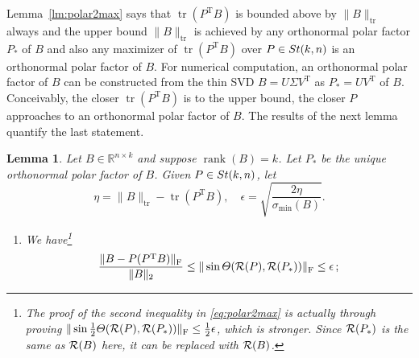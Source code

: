 \documentclass[11pt]{article}
\def\bbR{\mathbb{R}}
\def\cR{{\cal R}}
\newcommand\STM[2]{{\rm St}(#1,#2)}
\DeclareMathOperator{\rank}{rank}
\DeclareMathOperator{\tr}{tr}
\DeclareMathOperator{\F}{F}
\DeclareMathOperator{\T}{T}
\newtheorem{lemma}{Lemma}[section]
\theoremstyle{definition}
\numberwithin{equation}{section}
\begin{document}
Lemma~\ref{lm:polar2max} says that $\tr(P^{\T}B)$  is bounded  above by $\|B\|_{\tr}$ always and the upper bound
$\|B\|_{\tr}$ is achieved
by any orthonormal polar factor $P_*$ of $B$ and also any maximizer of $\tr(P^{\T}B)$ over $P\in\STM{k}{n}$ is an orthonormal polar factor of $B$.
For numerical computation, an orthonormal polar factor of $B$ can be constructed from the thin SVD $B=U\Sigma V^{\T}$ as
$P_*=UV^{\T}$ of $B$. Conceivably,
the closer $\tr(P^{\T}B)$ is to the upper bound, the closer $P$ approaches to an orthonormal polar factor of $B$.
The results of the next lemma quantify the last statement.

\begin{lemma}\label{lm:polar2max'}
Let $B\in\bbR^{n\times k}$ and suppose $\rank(B)=k$. Let $P_*$ be the unique
orthonormal polar factor of $B$.  Given $P\in\STM{k}{n}$, let
$$
\eta=\|B\|_{\tr}-\tr(P^{\T}B), \quad
\epsilon=\sqrt{\frac {2\eta}{\sigma_{\min}(B)}}.
$$
\begin{enumerate}[{\rm (a)}]
  \item We have\footnote {The proof of the second inequality in \eqref{eq:polar2max} is actually through proving
            $\|\sin\frac 12\Theta(\cR(P),\cR(P_*))\|_{\F}\le \frac 12{\epsilon}$, which is stronger.
            Since $\cR(P_*)$ is the same as $\cR(B)$ here, it can be replaced with $\cR(B)$.}
        \begin{equation}\label{eq:polar2max}
        \frac {\|B-P(P^{\T}B)\|_{\F}}{\|B\|_2}\le\|\sin\Theta(\cR(P),\cR(P_*))\|_{\F}\le {\epsilon}\,;
        \end{equation}

\end{enumerate}
\end{lemma}
\end{document}
